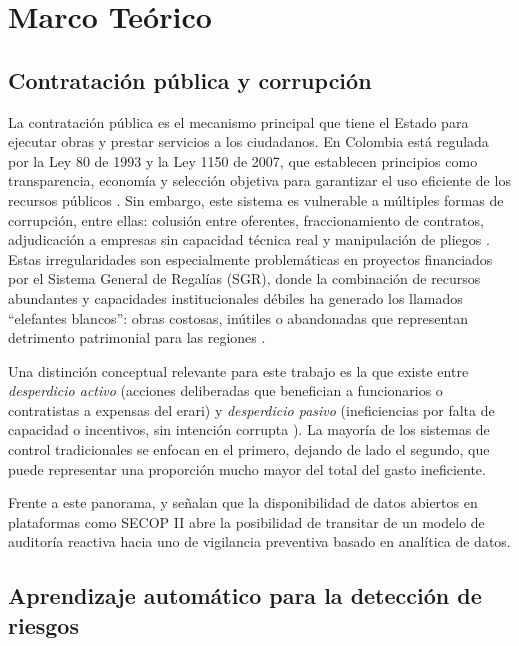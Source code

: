 \section{Marco Teórico}

\subsection{Contratación pública y corrupción}

La contratación pública es el mecanismo principal que tiene el Estado para ejecutar obras y prestar servicios a los ciudadanos. En Colombia está regulada por la Ley 80 de 1993 y la Ley 1150 de 2007, que establecen principios como transparencia, economía y selección objetiva para garantizar el uso eficiente de los recursos públicos \cite{mendieta2022regimen}. Sin embargo, este sistema es vulnerable a múltiples formas de corrupción, entre ellas: colusión entre oferentes, fraccionamiento de contratos, adjudicación a empresas sin capacidad técnica real y manipulación de pliegos \cite{decarolis2022corruption}. Estas irregularidades son especialmente problemáticas en proyectos financiados por el Sistema General de Regalías (SGR), donde la combinación de recursos abundantes y capacidades institucionales débiles ha generado los llamados ``elefantes blancos'': obras costosas, inútiles o abandonadas que representan detrimento patrimonial para las regiones \cite{gomez2025data}.

Una distinción conceptual relevante para este trabajo es la que existe entre \textit{desperdicio activo} (acciones deliberadas que benefician a funcionarios o contratistas a expensas del erari) y \textit{desperdicio pasivo} (ineficiencias por falta de capacidad o incentivos, sin intención corrupta \cite{salazar2024vigia}). La mayoría de los sistemas de control tradicionales se enfocan en el primero, dejando de lado el segundo, que puede representar una proporción mucho mayor del total del gasto ineficiente.

Frente a este panorama, \cite{sierra2025contratacion} y \cite{calderon2025contratacion} señalan que la disponibilidad de datos abiertos en plataformas como SECOP II abre la posibilidad de transitar de un modelo de auditoría reactiva hacia uno de vigilancia preventiva basado en analítica de datos.

\subsection{Aprendizaje automático para la detección de riesgos}

